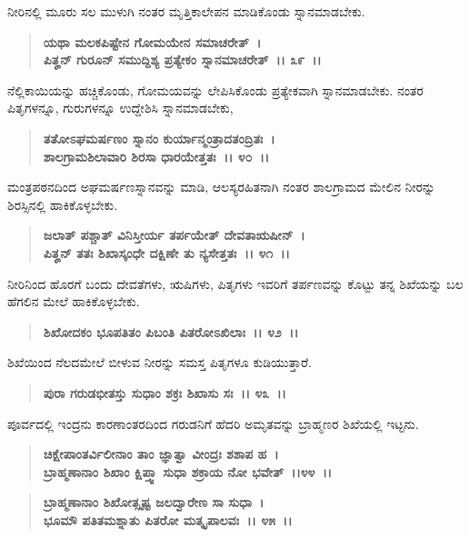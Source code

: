 ನೀರಿನಲ್ಲಿ ಮೂರು ಸಲ ಮುಳುಗಿ ನಂತರ ಮೃತ್ತಿಕಾಲೇಪನ ಮಾಡಿಕೊಂಡು ಸ್ನಾನಮಾಡಬೇಕು.

\begin{verse}
\textbf{ಯಥಾ ಮಲಕಪಿಷ್ಟೇನ ಗೋಮಯೇನ ಸಮಾಚರೇತ್~।}\\\textbf{ಪಿತೄನ್ ಗುರೂನ್ ಸಮುದ್ದಿಶ್ಯ ಪ್ರತ್ಯೇಕಂ ಸ್ನಾನಮಾಚರೇತ್~।। ೩೯~।।}
\end{verse}

ನೆಲ್ಲಿಕಾಯಿಯನ್ನು ಹಚ್ಚಿಕೊಂಡು, ಗೋಮಯವನ್ನು ಲೇಪಿಸಿಕೊಂಡು ಪ್ರತ್ಯೇಕವಾಗಿ ಸ್ನಾನಮಾಡಬೇಕು. ನಂತರ ಪಿತೃಗಳನ್ನೂ, ಗುರುಗಳನ್ನೂ ಉದ್ದೇಶಿಸಿ ಸ್ನಾನಮಾಡಬೇಕು,

\begin{verse}
\textbf{ತತೋಽಘಮರ್ಷಣಂ ಸ್ನಾನಂ ಕುರ್ಯಾನ್ಮಂತ್ರಾದತಂದ್ರಿತಃ~।}\\\textbf{ಶಾಲಗ್ರಾಮಶಿಲಾವಾರಿ ಶಿರಸಾ ಧಾರಯೇತ್ತತಃ~।। ೪೦~।।}
\end{verse}

ಮಂತ್ರಪಠನದಿಂದ ಅಘಮರ್ಷಣಸ್ನಾನವನ್ನು ಮಾಡಿ, ಆಲಸ್ಯರಹಿತನಾಗಿ ನಂತರ ಶಾಲಗ್ರಾಮದ ಮೇಲಿನ ನೀರನ್ನು ಶಿರಸ್ಸಿನಲ್ಲಿ ಹಾಕಿಕೊಳ್ಳಬೇಕು.

\begin{verse}
\textbf{ಜಲಾತ್ ಪಶ್ಚಾತ್ ವಿನಿಸ್ತೀರ್ಯ ತರ್ಪಯೇತ್ ದೇವತಾಋಷೀನ್~।}\\\textbf{ಪಿತೄನ್ ತತಃ ಶಿಖಾಸ್ಕಂಧೇ ದಕ್ಷಿಣೇ ತು ನ್ಯಸೇತ್ತತಃ~।। ೪೧~।। }
\end{verse}

ನೀರಿನಿಂದ ಹೊರಗೆ ಬಂದು ದೇವತೆಗಳು, ಋಷಿಗಳು, ಪಿತೃಗಳು ಇವರಿಗೆ ತರ್ಪಣವನ್ನು ಕೊಟ್ಟು ತನ್ನ ಶಿಖೆಯನ್ನು ಬಲ ಹೆಗಲಿನ ಮೇಲೆ ಹಾಕಿಕೊಳ್ಳಬೇಕು.

\begin{verse}
\textbf{ಶಿಖೋದಕಂ ಭೂಪತಿತಂ ಪಿಬಂತಿ ಪಿತರೋಽಖಿಲಾಃ~।। ೪೨~।।}
\end{verse}

ಶಿಖೆಯಿಂದ ನೆಲದಮೇಲೆ ಬೀಳುವ ನೀರನ್ನು ಸಮಸ್ತ ಪಿತೃಗಳೂ ಕುಡಿಯುತ್ತಾರೆ.

\begin{verse}
\textbf{ಪುರಾ ಗರುಡಭೀತಸ್ತು ಸುಧಾಂ ಶಕ್ರಃ ಶಿಖಾಸು ಸಃ~।। ೪೩~।।}
\end{verse}

ಪೂರ್ವದಲ್ಲಿ ಇಂದ್ರನು ಕಾರಣಾಂತರದಿಂದ ಗರುಡನಿಗೆ ಹೆದರಿ ಅಮೃತವನ್ನು ಬ್ರಾಹ್ಮಣರ ಶಿಖೆಯಲ್ಲಿ ಇಟ್ಟನು.

\begin{verse}
\textbf{ಚಿಕ್ಷೇಪಾಂತರ್ವಿಲೀನಾಂ ತಾಂ ಜ್ಞಾತ್ವಾ ವೀಂದ್ರಃ ಶಶಾಪ ಹ~।}\\\textbf{ಬ್ರಾಹ್ಮಣಾನಾಂ ಶಿಖಾಂ ಕ್ಷಿಪ್ತ್ವಾ ಸುಧಾ ಶಕ್ರಾಯ ನೋ ಭವೇತ್~।।೪೪~।।}
\end{verse}

\begin{verse}
\textbf{ಬ್ರಾಹ್ಮಣಾನಾಂ ಶಿಖೋತ್ಸೃಷ್ಟ ಜಲದ್ವಾರೇಣ ಸಾ ಸುಧಾ~।}\\\textbf{ಭೂಮೌ ಪತಿತಮಶ್ನಾತು ಪಿತರೋ ಮತ್ಕೃಪಾಲವಃ~।। ೪೫~।।}
\end{verse}

